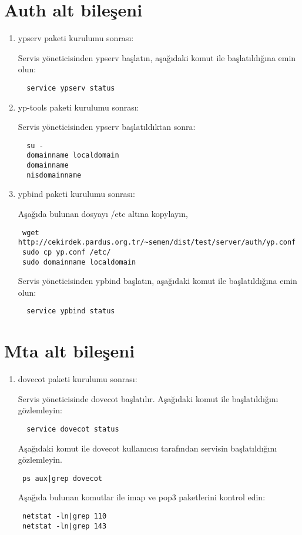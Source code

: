 \documentclass[a4paper,10pt]{article}
\begin{document}
\section{Auth alt bileşeni}
\begin{enumerate}
 \item ypserv paketi kurulumu sonrası:

Servis yöneticisinden ypserv başlatın, aşağıdaki komut ile başlatıldığına emin olun:
\begin{verbatim}
  service ypserv status
\end{verbatim}

\item yp-tools paketi kurulumu sonrası:

Servis yöneticisinden ypserv başlatıldıktan sonra:
\begin{verbatim}
  su -
  domainname localdomain
  domainname
  nisdomainname
\end{verbatim}

\item ypbind paketi kurulumu sonrası:

Aşağıda bulunan dosyayı /etc altına kopylayın,
\begin{verbatim}
 wget http://cekirdek.pardus.org.tr/~semen/dist/test/server/auth/yp.conf 
 sudo cp yp.conf /etc/
 sudo domainname localdomain
\end{verbatim}

Servis yöneticisinden ypbind başlatın, aşağıdaki komut ile başlatıldığına emin olun:
\begin{verbatim}
  service ypbind status
\end{verbatim}

\end{enumerate}

\section{Mta alt bileşeni}
\begin{enumerate}
 \item dovecot paketi kurulumu sonrası:

Servis yöneticisinde dovecot başlatılır.
Aşağıdaki komut ile başlatıldığını gözlemleyin:
\begin{verbatim}
  service dovecot status
\end{verbatim}
Aşağıdaki komut ile dovecot kullanıcısı tarafından servisin başlatıldığını gözlemleyin.
\begin{verbatim}
 ps aux|grep dovecot 
\end{verbatim}

Aşağıda bulunan komutlar ile imap ve pop3 paketlerini kontrol edin:
\begin{verbatim}
 netstat -ln|grep 110
 netstat -ln|grep 143
\end{verbatim}

\end{enumerate}
\end{document}
